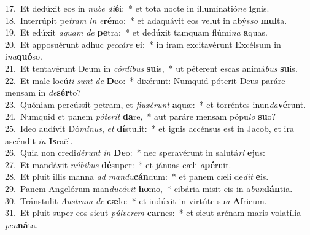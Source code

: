 {17.~}Et dedúxit eos in \textit{nu}\textit{be} \textit{di}\textbf{é}i:~* et tota nocte in illuminatió\textit{ne} \textbf{i}gnis.\\
{18.~}Interrúpit pe\textit{tram} \textit{in} \textit{e}\textbf{ré}mo:~* et adaquávit eos velut in abýs\textit{so} \textbf{mul}ta.\\
{19.~}Et edúxit \textit{a}\textit{quam} \textit{de} \textbf{pe}tra:~* et dedúxit tamquam flúmi\textit{na} \textbf{a}quas.\\
{20.~}Et apposuérunt adhuc \textit{pec}\textit{cá}\textit{re} \textbf{e}i:~* in iram excitavérunt Excélsum in i\textit{na}\textbf{quó}so.\\
{21.~}Et tentavérunt Deum in \textit{cór}\textit{di}\textit{bus} \textbf{su}is,~* ut péterent escas animá\textit{bus} \textbf{su}is.\\
{22.~}Et male locú\textit{ti} \textit{sunt} \textit{de} \textbf{De}o:~* dixérunt: Numquid póterit Deus paráre mensam in \textit{de}\textbf{sér}to?\\
{23.~}Quóniam percússit petram, et \textit{flu}\textit{xé}\textit{runt} \textbf{a}quæ:~* et torréntes inun\textit{da}\textbf{vé}runt.\\
{24.~}Numquid et panem \textit{pó}\textit{te}\textit{rit} \textbf{da}re,~* aut paráre mensam pópu\textit{lo} \textbf{su}o?\\
{25.~}Ideo audívit Dó\textit{mi}\textit{nus}, \textit{et} \textbf{dí}stulit:~* et ignis accénsus est in Jacob, et ira ascéndit \textit{in} \textbf{Is}raël.\\
{26.~}Quia non credi\textit{dé}\textit{runt} \textit{in} \textbf{De}o:~* nec speravérunt in salutá\textit{ri} \textbf{e}jus:\\
{27.~}Et mandávit \textit{nú}\textit{bi}\textit{bus} \textbf{dé}super:~* et jánuas cæli \textit{a}\textbf{pé}ruit.\\
{28.~}Et pluit illis manna \textit{ad} \textit{man}\textit{du}\textbf{cán}dum:~* et panem cæli de\textit{dit} \textbf{e}is.\\
{29.~}Panem Angelórum man\textit{du}\textit{cá}\textit{vit} \textbf{ho}mo,~* cibária misit eis in a\textit{bun}\textbf{dán}tia.\\
{30.~}Tránstulit \textit{Au}\textit{strum} \textit{de} \textbf{cæ}lo:~* et indúxit in virtúte su\textit{a} \textbf{A}fricum.\\
{31.~}Et pluit super eos sicut \textit{púl}\textit{ve}\textit{rem} \textbf{car}nes:~* et sicut arénam maris volatília \textit{pen}\textbf{ná}ta.\\
